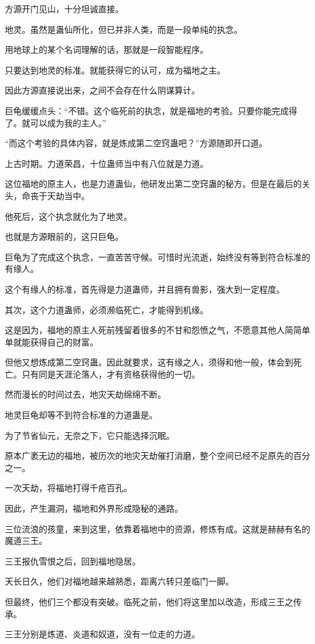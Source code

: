 \begin{this_body}
方源开门见山，十分坦诚直接。

地灵。虽然是蛊仙所化，但已并非人类，而是一段单纯的执念。

用地球上的某个名词理解的话，那就是一段智能程序。

只要达到地灵的标准。就能获得它的认可，成为福地之主。

因此方源直接说出来，之间不会存在什么阴谋算计。

巨龟缓缓点头：“不错。这个临死前的执念，就是福地的考验。只要你能完成得了。就可以成为我的主人。”

“而这个考验的具体内容，就是炼成第二空窍蛊吧？”方源随即开口道。

上古时期。力道荣昌，十位蛊师当中有八位就是力道。

这位福地的原主人，也是力道蛊仙，他研发出第二空窍蛊的秘方。但是在最后的关头，命丧于天劫当中。

他死后，这个执念就化为了地灵。

也就是方源眼前的，这只巨龟。

巨龟为了完成这个执念，一直苦苦守候。可惜时光流逝，始终没有等到符合标准的有缘人。

这个有缘人的标准，首先得是力道蛊师，并且拥有兽影，强大到一定程度。

其次，这个力道蛊师，必须濒临死亡，才能得到机缘。

这是因为，福地的原主人死前残留着很多的不甘和怨愤之气，不愿意其他人简简单单就能获得自己的财富。

但他又想炼成第二空窍蛊。因此就要求，这有缘之人，须得和他一般，体会到死亡。只有同是天涯沦落人，才有资格获得他的一切。

然而漫长的时间过去，地灾天劫绵绵不断。

地灵巨龟却等不到符合标准的力道蛊是。

为了节省仙元，无奈之下，它只能选择沉眠。

原本广袤无边的福地，被历次的地灾天劫催打消磨，整个空间已经不足原先的百分之一。

一次天劫，将福地打得千疮百孔。

因此，产生漏洞，福地和外界形成隐秘的通路。

三位流浪的孩童，来到这里，依靠着福地中的资源，修炼有成。这就是赫赫有名的魔道三王。

三王报仇雪恨之后，回到福地隐居。

天长日久，他们对福地越来越熟悉，距离六转只差临门一脚。

但最终，他们三个都没有突破。临死之前，他们将这里加以改造，形成三王之传承。

三王分别是炼道、炎道和奴道，没有一位走的力道。


\end{this_body}
